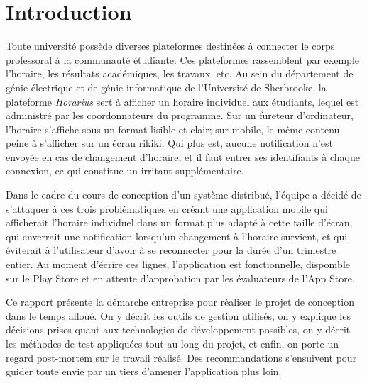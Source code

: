 \section{Introduction}
Toute université possède diverses plateformes destinées à connecter le corps professoral à la communauté étudiante. Ces plateformes rassemblent par exemple l'horaire, les résultats académiques, les travaux, etc. Au sein du département de génie électrique et de génie informatique de l'Université de Sherbrooke, la plateforme \emph{Horarius} sert à afficher un horaire individuel aux étudiants, lequel est administré par les coordonnateurs du programme. Sur un fureteur d'ordinateur, l'horaire s'affiche sous un format lisible et clair; sur mobile, le même contenu peine à s'afficher sur un écran rikiki. Qui plus est, aucune notification n'est envoyée en cas de changement d'horaire, et il faut entrer ses identifiants à chaque connexion, ce qui constitue un irritant supplémentaire.

Dans le cadre du cours de conception d'un système distribué, l'équipe a décidé de s'attaquer à ces trois problématiques en créant une application mobile qui afficherait l'horaire individuel dans un format plus adapté à cette taille d'écran, qui enverrait une notification lorsqu'un changement à l'horaire survient, et qui éviterait à l'utilisateur d'avoir à se reconnecter pour la durée d'un trimestre entier. Au moment d'écrire ces lignes, l'application est fonctionnelle, disponible sur le Play Store et en attente d'approbation par les évaluateurs de l'App Store.

Ce rapport présente la démarche entreprise pour réaliser le projet de conception dans le temps alloué. On y décrit les outils de gestion utilisés, on y explique les décisions prises quant aux  technologies de développement possibles, on y décrit les méthodes de test appliquées tout au long du projet, et enfin, on porte un regard post-mortem sur le travail réalisé. Des recommandations s'ensuivent pour guider toute envie par un tiers d'amener l'application plus loin.